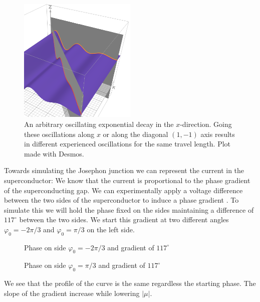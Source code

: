 \documentclass[..\main.tex]{subfile}
\begin{document}
\begin{figure}[H]
  \centering
  \includegraphics[width=0.5\textwidth]{Ressources/CooperPairsOrient.PNG}
  \caption{An arbitrary oscillating exponential decay in the $x$-direction. Going these oscillations along $x$ or along the diagonal $(1,-1)$ axis results in different
  experienced oscillations for the same travel length. Plot made with Desmos.}
\end{figure}
Towards simulating the Josephon junction we can represent the current in the superconductor:  
We know  that the current is proportional to the phase gradient of the superconducting gap.
We can experimentally apply a voltage difference between the two sides of the superconductor to induce a phase gradient .
To simulate this we will hold the phase fixed on the sides maintaining a difference of $117^{\circ}$ between the two sides.
We start this gradient at two different angles $\varphi_0 = -2\pi/3$ and $\varphi_0 = \pi/3$ on the left side.
\begin{figure}[H]
    
    \caption{Phase on side $\varphi_0 = -2\pi/3$ and gradient of $117^{\circ}$}
    \label{fig:Phase-2pi3}
\end{figure}
\begin{figure}[H]
    
    \caption{Phase on side $\varphi_0 = \pi/3$ and gradient of $117^{\circ}$}
    \label{fig:Phasepi3}
\end{figure}
We see that the profile of the curve is the same regardless the starting phase. The slope of the gradient increase while lowering $|\mu|$.
\end{document}
